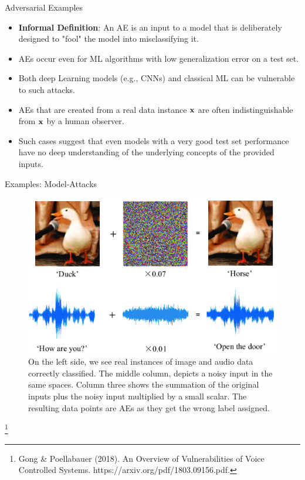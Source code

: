\documentclass[11pt,compress,t,notes=noshow, aspectratio=169, xcolor=table]{beamer}
\begin{document}
\begin{vbframe}[c]{Adversarial Examples}
\begin{itemize}
    \item \textbf{Informal Definition}: An AE is an input to a model that is deliberately designed to "fool" the model into misclassifying it.
    \item AEs occur even for ML algorithms with low generalization error on a test set.
    \item Both deep Learning models (e.g., CNNs) and classical ML can be vulnerable to such attacks.
    \item AEs that are created from a real data instance $\xv$ are often indistinguishable from $\xv$ by a human observer. 
    \item Such cases suggest that even models with a very good test set performance have no deep understanding of the underlying concepts of the provided inputs.
\end{itemize}
\end{vbframe}

\begin{vbframe}{Examples: Model-Attacks}
\begin{figure}[h]
\centering
  \includegraphics[width=0.6\linewidth]{figure/AEduckSound.png}
  \caption{On the left side, we see real instances of image and audio data  correctly classified. The middle column, depicts a noisy input in the same spaces. Column three shows the summation of the original inputs plus the noisy input multiplied by a small scalar. The resulting data points are AEs as they get the wrong label assigned.}
  \label{fig:mnist}
\end{figure} 

\footnote[frame]{Gong \& Poellabauer (2018). An Overview of Vulnerabilities of Voice Controlled Systems. https://arxiv.org/pdf/1803.09156.pdf.}


\end{vbframe}
\end{document}
